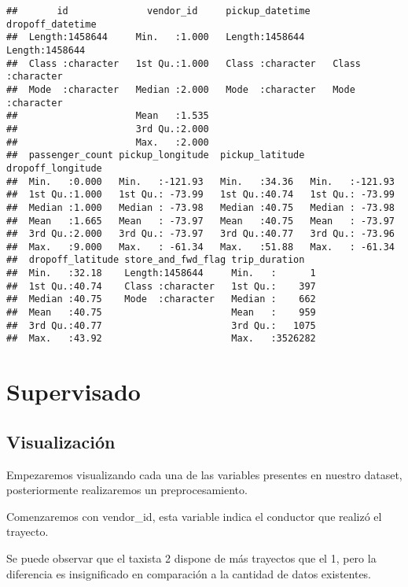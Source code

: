 \documentclass[
]{article}
\begin{document}
\begin{verbatim}
##       id              vendor_id     pickup_datetime    dropoff_datetime  
##  Length:1458644     Min.   :1.000   Length:1458644     Length:1458644    
##  Class :character   1st Qu.:1.000   Class :character   Class :character  
##  Mode  :character   Median :2.000   Mode  :character   Mode  :character  
##                     Mean   :1.535                                        
##                     3rd Qu.:2.000                                        
##                     Max.   :2.000                                        
##  passenger_count pickup_longitude  pickup_latitude dropoff_longitude
##  Min.   :0.000   Min.   :-121.93   Min.   :34.36   Min.   :-121.93  
##  1st Qu.:1.000   1st Qu.: -73.99   1st Qu.:40.74   1st Qu.: -73.99  
##  Median :1.000   Median : -73.98   Median :40.75   Median : -73.98  
##  Mean   :1.665   Mean   : -73.97   Mean   :40.75   Mean   : -73.97  
##  3rd Qu.:2.000   3rd Qu.: -73.97   3rd Qu.:40.77   3rd Qu.: -73.96  
##  Max.   :9.000   Max.   : -61.34   Max.   :51.88   Max.   : -61.34  
##  dropoff_latitude store_and_fwd_flag trip_duration    
##  Min.   :32.18    Length:1458644     Min.   :      1  
##  1st Qu.:40.74    Class :character   1st Qu.:    397  
##  Median :40.75    Mode  :character   Median :    662  
##  Mean   :40.75                       Mean   :    959  
##  3rd Qu.:40.77                       3rd Qu.:   1075  
##  Max.   :43.92                       Max.   :3526282
\end{verbatim}

\hypertarget{supervisado}{%
\section{Supervisado}\label{supervisado}}

\hypertarget{visualizaciuxf3n}{%
\subsection{Visualización}\label{visualizaciuxf3n}}

Empezaremos visualizando cada una de las variables presentes en nuestro
dataset, posteriormente realizaremos un preprocesamiento.

Comenzaremos con vendor\_id, esta variable indica el conductor que
realizó el trayecto.

Se puede observar que el taxista 2 dispone de más trayectos que el 1,
pero la diferencia es insignificado en comparación a la cantidad de
datos existentes.
\end{document}

